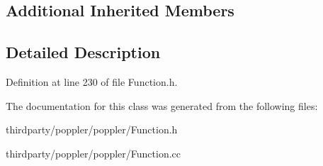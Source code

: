 \subsection*{Additional Inherited Members}


\subsection{Detailed Description}


Definition at line 230 of file Function.\+h.



The documentation for this class was generated from the following files\+:\begin{DoxyCompactItemize}
\item 
thirdparty/poppler/poppler/Function.\+h\item 
thirdparty/poppler/poppler/Function.\+cc\end{DoxyCompactItemize}
